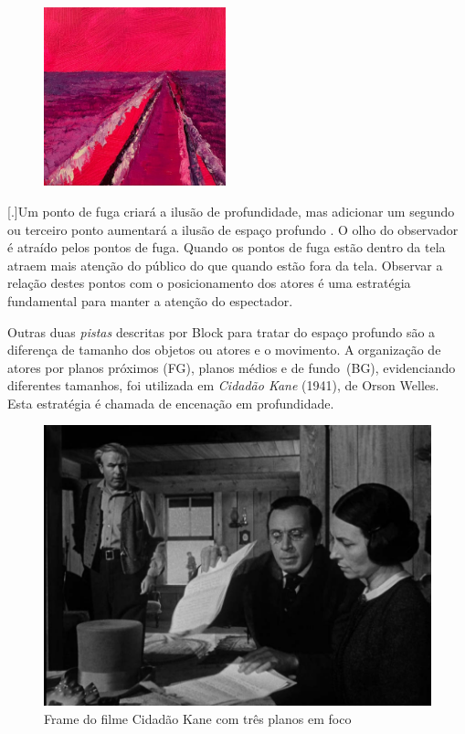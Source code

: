 \begin{figure}
	\caption{}

	\includegraphics[width=2.07143in,height=2.03511in]{figuras/odette-caminho-cor-rosa-2022.pdf.compressed.pdf}
\end{figure}

[.]{Um ponto de fuga criará a ilusão de profundidade, mas adicionar um
	segundo ou terceiro ponto aumentará a ilusão de espaço profundo} . O olho do observador
é atraído pelos pontos de fuga. Quando os pontos de fuga estão dentro da
tela atraem mais atenção do público do que quando estão fora da tela.
Observar a relação destes pontos com o posicionamento dos atores é uma
estratégia fundamental para manter a atenção do espectador.

Outras duas \emph{pistas} descritas por Block para tratar do espaço
profundo são a diferença de tamanho dos objetos ou atores e o
movimento. A organização de atores por planos próximos (FG), planos
médios e de fundo~(BG), evidenciando diferentes tamanhos, foi utilizada
em \emph{Cidadão Kane} (1941), de Orson Welles. Esta estratégia é
chamada de encenação em profundidade.

\begin{figure}
	\caption{Frame do filme Cidadão Kane com três planos em foco}
	\includegraphics[width=.6\linewidth]{figuras/frame-cidadao-kane.pdf.compressed.pdf}
\end{figure}

